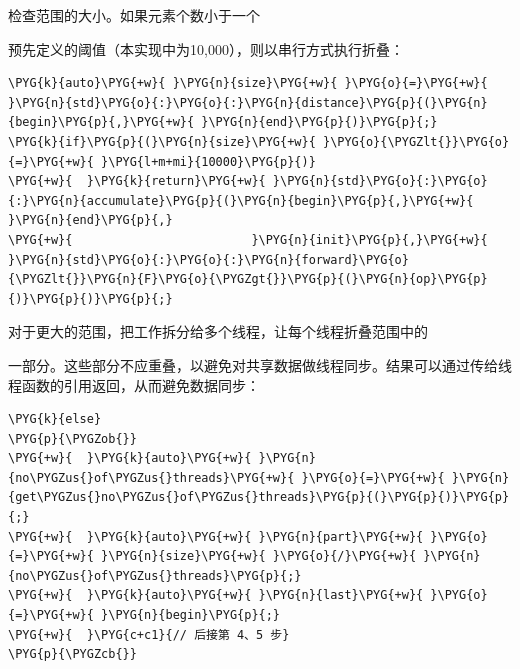 
检查范围的大小。如果元素个数小于一个



预先定义的阈值（本实现中为10,000），则以串行方式执行折叠：



\begin{codeblockbg}
\begin{Verbatim}[commandchars=\\\{\},breaklines=true,breakanywhere=true,fontsize=\codefont,xleftmargin=17bp]
\PYG{k}{auto}\PYG{+w}{ }\PYG{n}{size}\PYG{+w}{ }\PYG{o}{=}\PYG{+w}{ }\PYG{n}{std}\PYG{o}{:}\PYG{o}{:}\PYG{n}{distance}\PYG{p}{(}\PYG{n}{begin}\PYG{p}{,}\PYG{+w}{ }\PYG{n}{end}\PYG{p}{)}\PYG{p}{;}
\PYG{k}{if}\PYG{p}{(}\PYG{n}{size}\PYG{+w}{ }\PYG{o}{\PYGZlt{}}\PYG{o}{=}\PYG{+w}{ }\PYG{l+m+mi}{10000}\PYG{p}{)}
\PYG{+w}{  }\PYG{k}{return}\PYG{+w}{ }\PYG{n}{std}\PYG{o}{:}\PYG{o}{:}\PYG{n}{accumulate}\PYG{p}{(}\PYG{n}{begin}\PYG{p}{,}\PYG{+w}{ }\PYG{n}{end}\PYG{p}{,}
\PYG{+w}{                         }\PYG{n}{init}\PYG{p}{,}\PYG{+w}{ }\PYG{n}{std}\PYG{o}{:}\PYG{o}{:}\PYG{n}{forward}\PYG{o}{\PYGZlt{}}\PYG{n}{F}\PYG{o}{\PYGZgt{}}\PYG{p}{(}\PYG{n}{op}\PYG{p}{)}\PYG{p}{)}\PYG{p}{;}
\end{Verbatim}
\end{codeblockbg}



对于更大的范围，把工作拆分给多个线程，让每个线程折叠范围中的



一部分。这些部分不应重叠，以避免对共享数据做线程同步。结果可以通过传给线程函数的引用返回，从而避免数据同步：



\begin{codeblockbg}
\begin{Verbatim}[commandchars=\\\{\},breaklines=true,breakanywhere=true,fontsize=\codefont,xleftmargin=17bp]
\PYG{k}{else}
\PYG{p}{\PYGZob{}}
\PYG{+w}{  }\PYG{k}{auto}\PYG{+w}{ }\PYG{n}{no\PYGZus{}of\PYGZus{}threads}\PYG{+w}{ }\PYG{o}{=}\PYG{+w}{ }\PYG{n}{get\PYGZus{}no\PYGZus{}of\PYGZus{}threads}\PYG{p}{(}\PYG{p}{)}\PYG{p}{;}
\PYG{+w}{  }\PYG{k}{auto}\PYG{+w}{ }\PYG{n}{part}\PYG{+w}{ }\PYG{o}{=}\PYG{+w}{ }\PYG{n}{size}\PYG{+w}{ }\PYG{o}{/}\PYG{+w}{ }\PYG{n}{no\PYGZus{}of\PYGZus{}threads}\PYG{p}{;}
\PYG{+w}{  }\PYG{k}{auto}\PYG{+w}{ }\PYG{n}{last}\PYG{+w}{ }\PYG{o}{=}\PYG{+w}{ }\PYG{n}{begin}\PYG{p}{;}
\PYG{+w}{  }\PYG{c+c1}{// 后接第 4、5 步}
\PYG{p}{\PYGZcb{}}
\end{Verbatim}
\end{codeblockbg}


